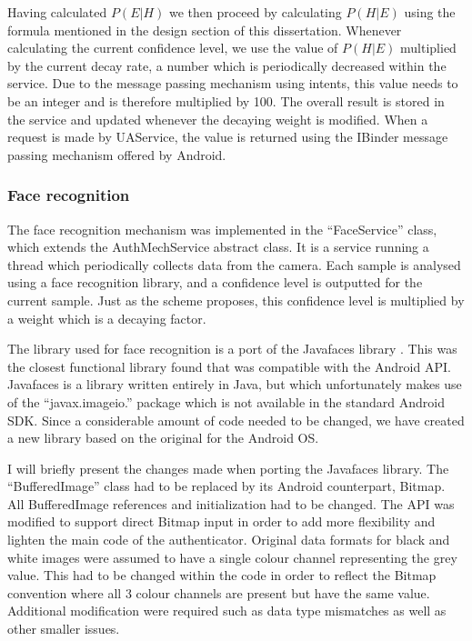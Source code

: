 Having calculated $P(E|H)$ we then proceed by calculating $P(H|E)$ using the formula mentioned in the design section of this dissertation. Whenever calculating the current confidence level, we use the value of $P(H|E)$ multiplied by the current decay rate, a number which is periodically decreased within the service. Due to the message passing mechanism using intents, this value needs to be an integer and is therefore multiplied by 100. The overall result is stored in the service and updated whenever the decaying weight is modified. When a request is made by UAService, the value is returned using the IBinder message passing mechanism offered by Android.

\subsubsection{Face recognition}
The face recognition mechanism was implemented in the ``FaceService'' class, which extends the AuthMechService abstract class. It is a service running a thread which periodically collects data from the camera. Each sample is analysed using a face recognition library, and a confidence level is outputted for the current sample. Just as the scheme proposes, this confidence level is multiplied by a weight which is a decaying factor.

The library used for face recognition is a port of the Javafaces library \cite{}. This was the closest functional library found that was compatible with the Android API. Javafaces is a library written entirely in Java, but which unfortunately makes use of the ``javax.imageio.'' package which is not available in the standard Android SDK. Since a considerable amount of code needed to be changed, we have created a new library \cite{} based on the original for the Android OS.

I will briefly present the changes made when porting the Javafaces library. The ``BufferedImage'' class had to be replaced by its Android counterpart, Bitmap. All BufferedImage references and initialization had to be changed. The API was modified to support direct Bitmap input in order to add more flexibility and lighten the main code of the authenticator. Original data formats for black and white images were assumed to have a single colour channel representing the grey value. This had to be changed within the code in order to reflect the Bitmap convention where all 3 colour channels are present but have the same value. Additional modification were required such as data type mismatches as well as other smaller issues.

